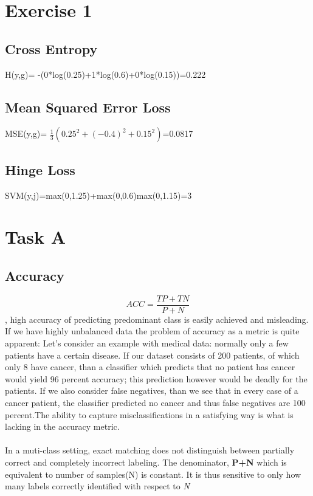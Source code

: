 \documentclass[10pt]{article}
\begin{document}
\section{Exercise 1}
\subsection{Cross Entropy}
H(y,g)= -(0*log(0.25)+1*log(0.6)+0*log(0.15))=0.222
\subsection{Mean Squared Error Loss}
MSE(y,g)= $\frac{1}{3}(0.25^2+(-0.4)^2+0.15^2)$=0.0817
\subsection{Hinge Loss}
SVM(y,j)=max(0,1.25)+max(0,0.6)max(0,1.15)=3

\section{Task A}
\subsection{Accuracy}
$$ACC = \frac{TP+TN}{P+N}$$, high accuracy of predicting predominant class is easily achieved and misleading.
If we have highly unbalanced data the problem of accuracy as a metric is quite apparent:
Let's consider an example with medical data: normally only a few patients have a certain disease.
If our dataset consists of 200 patients, of which only 8 have cancer, than a classifier which predicts
that no patient has cancer would yield 96 percent accuracy;
this prediction however would be deadly for the patients.
If we also consider false negatives, than we see that in every case of a cancer patient,
the classifier predicted no cancer and thus false negatives are 100 percent.The ability to  capture misclassifications in a satisfying way is what is lacking in the accuracy metric.
\paragraph{}
In a muti-class setting, exact matching does not distinguish between partially correct and completely incorrect labeling.
The denominator, \textbf{P+N} which is equivalent to number of samples(N) is constant. It is thus sensitive to only how many labels correctly identified with respect to \textit{N}
\end{document}
